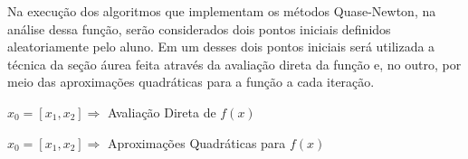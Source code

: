     Na execução dos algoritmos que implementam os métodos Quase-Newton, na análise dessa função, serão considerados dois pontos iniciais definidos aleatoriamente pelo aluno. Em um desses dois pontos iniciais será utilizada a técnica da seção áurea feita através da avaliação direta da função e, no outro, por meio das aproximações quadráticas para a função a cada iteração.

        \begin{minipage}{\linewidth}
            \centering
            $x_0=[x_1,x_2]\Longrightarrow$  Avaliação Direta de $f(x)$
            \label{tab:tblg} 
            \writetable{\tblg}
            \bigskip
        \end{minipage}
        
        \begin{minipage}{\linewidth}
            \centering
            $x_0=[x_1,x_2]\Longrightarrow$  Aproximações Quadráticas para $f(x)$
            \label{tab:tblh} 
            \writetable{\tblh}
            \bigskip
        \end{minipage}
\newpage